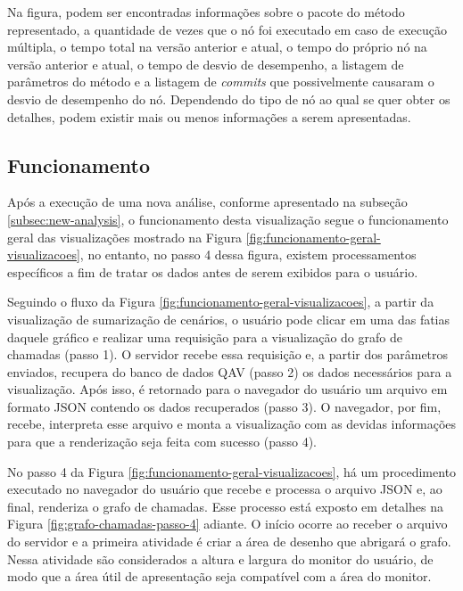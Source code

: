 Na figura, podem ser encontradas informações sobre o pacote do método representado, a quantidade de vezes que o nó foi executado em caso de execução múltipla, o tempo total na versão anterior e atual, o tempo do próprio nó na versão anterior e atual, o tempo de desvio de desempenho, a listagem de parâmetros do método e a listagem de \textit{commits} que possivelmente causaram o desvio de desempenho do nó. Dependendo do tipo de nó ao qual se quer obter os detalhes, podem existir mais ou menos informações a serem apresentadas.

\FloatBarrier %

\subsection{Funcionamento} \label{subsec:funcionamento-visualizacao-2}

Após a execução de uma nova análise, conforme apresentado na subseção \ref{subsec:new-analysis}, o funcionamento desta visualização segue o funcionamento geral das visualizações mostrado na Figura \ref{fig:funcionamento-geral-visualizacoes}, no entanto, no passo 4 dessa figura, existem processamentos específicos a fim de tratar os dados antes de serem exibidos para o usuário.

Seguindo o fluxo da Figura \ref{fig:funcionamento-geral-visualizacoes}, a partir da visualização de sumarização de cenários, o usuário pode clicar em uma das fatias daquele gráfico e realizar uma requisição para a visualização do grafo de chamadas (passo 1). O servidor recebe essa requisição e, a partir dos parâmetros enviados, recupera do banco de dados QAV (passo 2) os dados necessários para a visualização. Após isso, é retornado para o navegador do usuário um arquivo em formato JSON contendo os dados recuperados (passo 3). O navegador, por fim, recebe, interpreta esse arquivo e monta a visualização com as devidas informações para que a renderização seja feita com sucesso (passo 4).

No passo 4 da Figura \ref{fig:funcionamento-geral-visualizacoes}, há um procedimento executado no navegador do usuário que recebe e processa o arquivo JSON e, ao final, renderiza o grafo de chamadas. Esse processo está exposto em detalhes na Figura \ref{fig:grafo-chamadas-passo-4} adiante. O início ocorre ao receber o arquivo do servidor e a primeira atividade é criar a área de desenho que abrigará o grafo. Nessa atividade são considerados a altura e largura do monitor do usuário, de modo que a área útil de apresentação seja compatível com a área do monitor.


